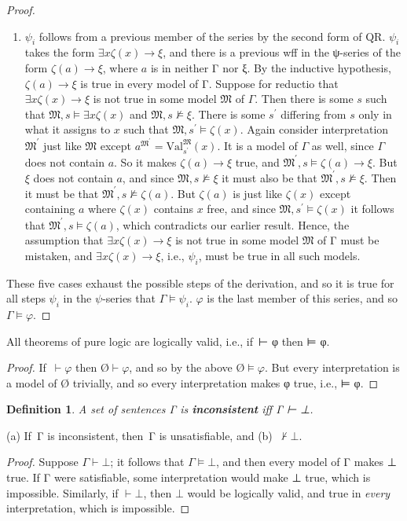 \documentclass[12pt]{report}
\theoremstyle{nonumberplain}
\newtheorem{definition}{Definition}
\newtheorem{proof}{Proof}
\newcommand{\M}{\mathfrak{M}}
\newcommand{\Val}{\mathrm{Val}}
\newcommand{\ValMsp}{\Val^{\M}_{s^{\prime}}}
\newcommand{\defm}[1]{\textbf{#1}\index{#1}}
\begin{document}
\begin{proof}
\begin{enumerate}
\item $ψ_i$ follows from a previous member of the series by the second form of QR. $ψ_i$ takes the form $∃xζ(x) → ξ$, and there is a previous wff in the ψ-series of the form $ζ(a) → ξ$, where $a$ is in neither Γ nor ξ. By the inductive hypothesis, $ζ(a) → ξ$ is true in every model of Γ. Suppose for reductio that $∃xζ(x) → ξ$ is not true in some model $\M$ of $Γ$. Then there is some $s$ such that $\M, s ⊨ ∃xζ(x)$ and $\M, s ⊭ ξ$. There is some $s^\prime$ differing from $s$ only in what it assigns to $x$ such that $\M, s^{\prime} ⊨ ζ(x)$. Again consider interpretation $\M^{\prime}$ just like $\M$ except $a^{\M^{\prime}} = \ValMsp(x)$. It is a model of $Γ$ as well, since $Γ$ does not contain $a$. So it makes $ζ(a) → ξ$ true, and $\M^{\prime}, s ⊨ ζ(a) → ξ$. But $\xi$ does not contain $a$, and since $\M, s ⊭ ξ$ it must also be that $\M^{\prime}, s ⊭ ξ$. Then it must be that $\M^{\prime}, s ⊭ ζ(a)$. But $ζ(a)$ is just like $ζ(x)$ except containing $a$ where $ζ(x)$ contains $x$ free, and since $\M, s^{\prime} ⊨ ζ(x)$ it follows that  $\M^{\prime}, s ⊨ ζ(a)$, which contradicts our earlier result. Hence, the assumption that $∃xζ(x) → ξ$ is not true in some model $\M$ of Γ must be mistaken, and $∃xζ(x) → ξ$, i.e., $ψ_i$, must be true in all such models.

\end{enumerate}
These five cases exhaust the possible steps of the derivation, and so it is true for all steps $ψ_i$ in the $ψ$-series that $Γ ⊨ ψ_i$. $φ$ is the last member of this series, and so $Γ ⊨ φ$.
\end{proof}

\begin{coro}
All theorems of pure logic are logically valid, i.e., if \,⊢ φ then ⊨ φ.
\end{coro}
\begin{proof}
If \,$⊢ φ$ then $Ø ⊢ φ$, and so by the above $Ø ⊨ φ$. But every interpretation is a model of Ø trivially, and so every interpretation makes φ true, i.e., ⊨ φ.
\end{proof}

\begin{definition}
A set of sentences Γ is \defm{inconsistent} iff Γ ⊢ ⊥.
\end{definition}

\begin{coro}[Consistency]
(a) If \,Γ is inconsistent, then \,Γ is unsatisfiable, and (b) \,$⊬ ⊥$.\label{con}
\end{coro}
\begin{proof} Suppose $Γ ⊢ ⊥$; it follows that $Γ ⊨ ⊥$, and then every model of Γ makes ⊥ true. If Γ were satisfiable, some interpretation would make ⊥ true, which is impossible. Similarly, if $⊢ ⊥$, then $⊥$ would be logically valid, and true in \emph{every} interpretation, which is impossible.   \end{proof}
\end{document}

